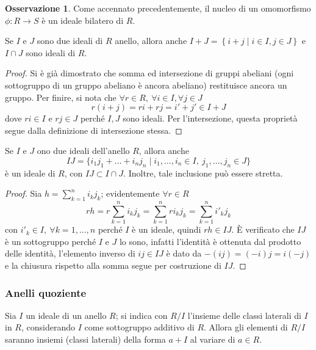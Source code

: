 \documentclass[11pt, a4paper]{scrartcl}
\theoremstyle{definition}
\numberwithin{esempio}{section}
\theoremstyle{definition}
\newtheorem{obs}{Osservazione}
\numberwithin{obs}{section}
\numberwithin{nota}{section}
\numberwithin{equation}{subsection}
\begin{document}
\begin{obs}
	Come accennato precedentemente, il nucleo di un omomorfismo $\phi :R\to S $ \`e un ideale bilatero di $R$.
\end{obs}
\begin{prop}
	{}{}
	Se $I$ e $J$ sono due ideali di $R$ anello, allora anche $I+J = \left\{ i+j  \mid i \in I, j\in J \right\} $ e $I\cap J$ sono ideali di $R$.
	\begin{proof}
		Si \`e gi\`a dimostrato che somma ed intersezione di gruppi abeliani (ogni sottogruppo di un gruppo abeliano \`e ancora abeliano) restituisce ancora un gruppo.
		Per finire, si nota che $\forall r \in R, \ \forall i \in I, \forall j \in J$
		\[
			 r(i+j) = ri +rj = i' + j' \in I+J 
		\] 
		dove $ri \in I$ e $rj \in J$ perch\'e $I,J$ sono ideali. 
		Per l'intersezione, questa propriet\`a segue dalla definizione di intersezione stessa.
	\end{proof}
\end{prop}
\begin{prop}
	{}{}
	Se $I$ e $J$ ono due ideali dell'anello $R$, allora anche
	\[
	IJ = \big\{ i_1j_1 + \ldots+i_nj_n  \mid i_1,\ldots,i_n \in I , \ j_1,\ldots,j_n \in J\big\} 
	\] 
	\`e un ideale di $R$, con $IJ \subset I\cap J$. Inoltre, tale inclusione pu\`o essere stretta.
	\begin{proof}
		Sia $h = \sum_{k=1}^{n} i_kj_k$; evidentemente $\forall r \in R$
		\[
		r h = r \sum_{k=1}^{n} i_kj_k = \sum_{k=1}^{n} ri_k j_k= \sum_{k=1}^{n} i'_kj_k
		\] 
	con $i'_k \in I,\ \forall k=1,\ldots,n$ perch\'e $I$ \`e un ideale, quindi $r h \in IJ$.	 
	\`E verificato che $IJ$ \`e un sottogruppo perch\'e $I$ e $J$ lo sono, infatti l'identit\`a \`e ottenuta dal prodotto delle identit\`a, l'elemento inverso di $ij \in IJ$ \`e dato da $-(ij)=(-i)j=i(-j)$ e la chiusura rispetto alla somma segue per costruzione di $IJ$.
	\end{proof}
\end{prop}
\subsubsection{Anelli quoziente}
Sia $I$ un ideale di un anello $R$; si indica con $R / I$ l'insieme delle classi laterali di $I$ in $R$, considerando $I$ come sottogruppo additivo di $R$.
Allora gli elementi di $R / I$ saranno insiemi (classi laterali) della forma $a + I$ al variare di $a \in R$.
\end{document}
